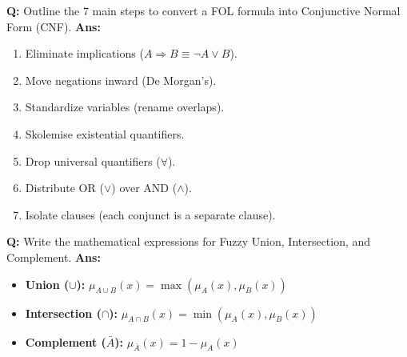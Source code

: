 \documentclass[10pt,a4paper,twocolumn]{article}
\begin{document}
\begin{tcolorbox}[
  colback=white,
  colframe=UnitColorEight,
  colbacktitle=gray!10!white,
  coltitle=black,
  fonttitle=\bfseries\sffamily\small,
  title={Unit VIII $\bullet$ Card 4: FOPL to CNF Conversion Steps},
  boxrule=1.2pt,
  arc=2mm,
  outer arc=2mm,
  boxsep=1.5mm,
  top=1mm,
  bottom=1mm,
  left=1.5mm,
  right=1.5mm,
  before skip=2.5mm,
  after skip=2.5mm
]
\textbf{Q:} Outline the 7 main steps to convert a FOL formula into Conjunctive Normal Form (CNF).
\tcbline
\textbf{Ans:} \begin{enumerate}
  \item Eliminate implications ($A \Rightarrow B \equiv \neg A \lor B$).
  \item Move negations inward (De Morgan's).
  \item Standardize variables (rename overlaps).
  \item Skolemise existential quantifiers.
  \item Drop universal quantifiers ($\forall$).
  \item Distribute OR ($\lor$) over AND ($\land$).
  \item Isolate clauses (each conjunct is a separate clause).
\end{enumerate}
\end{tcolorbox}


\begin{tcolorbox}[
  colback=white,
  colframe=UnitColorEight,
  colbacktitle=gray!10!white,
  coltitle=black,
  fonttitle=\bfseries\sffamily\small,
  title={Unit VIII $\bullet$ Card 5: Fuzzy Set Operations},
  boxrule=1.2pt,
  arc=2mm,
  outer arc=2mm,
  boxsep=1.5mm,
  top=1mm,
  bottom=1mm,
  left=1.5mm,
  right=1.5mm,
  before skip=2.5mm,
  after skip=2.5mm
]
\textbf{Q:} Write the mathematical expressions for Fuzzy Union, Intersection, and Complement.
\tcbline
\textbf{Ans:} \begin{itemize}
  \item   \textbf{Union ($\cup$):} $\mu_{A \cup B}(x) = \max(\mu_A(x), \mu_B(x))$
  \item   \textbf{Intersection ($\cap$):} $\mu_{A \cap B}(x) = \min(\mu_A(x), \mu_B(x))$
  \item   \textbf{Complement ($\bar{A}$):} $\mu_{\bar{A}}(x) = 1 - \mu_A(x)$
\end{itemize}
\end{tcolorbox}
\end{document}
